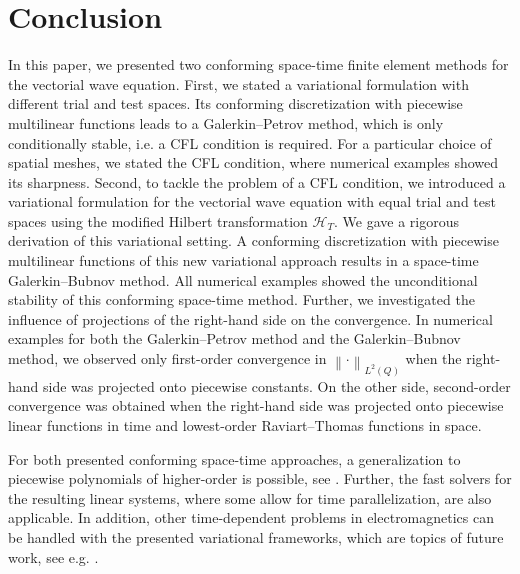 \documentclass[a4paper,11pt]{article}
\newcommand{\norm}[1]{{\left\lVert{#1}\right\rVert}}
\begin{document}
\section{Conclusion} \label{Sec:Zum}

In this paper, we presented two conforming space-time finite element methods for the vectorial wave equation. First, we stated a variational formulation with different trial and test spaces. Its conforming discretization with piecewise multilinear functions leads to a Galerkin--Petrov method, which is only conditionally stable, i.e. a CFL condition is required. For a particular choice of spatial meshes, we stated the CFL condition, where numerical examples showed its sharpness. Second, to tackle the problem of a CFL condition, we introduced a variational formulation for the vectorial wave equation with equal trial and test spaces using the modified Hilbert transformation $\mathcal H_T$. We gave a rigorous derivation of this variational setting. A conforming discretization with piecewise multilinear functions of this new variational approach results in a space-time Galerkin--Bubnov method. All numerical examples showed the unconditional stability of this conforming space-time method. 
Further, we investigated the influence of projections of the right-hand side on the convergence. In numerical examples for both the Galerkin--Petrov method and the Galerkin--Bubnov method, we observed only first-order convergence in $\norm{\cdot}_{L^2(Q)}$ when the right-hand side was projected onto piecewise constants.  On the other side, second-order convergence was obtained when the right-hand side was projected onto piecewise linear functions in time and lowest-order Raviart--Thomas functions in space.

For both presented conforming space-time approaches, a generalization to piecewise polynomials of higher-order is possible, see \cite{HauserOhm2023}. Further, the fast solvers \cite{LangerZankSISC2021, ZankWelleLoeser, ZankWaermeLoeserICOSAHOM2022} for the resulting linear systems, where some allow for time parallelization, are also applicable. In addition, other time-dependent problems in electromagnetics can be handled with the presented variational frameworks, which are topics of future work, see e.g. \cite{HauserOhm2023}.



\end{document}
